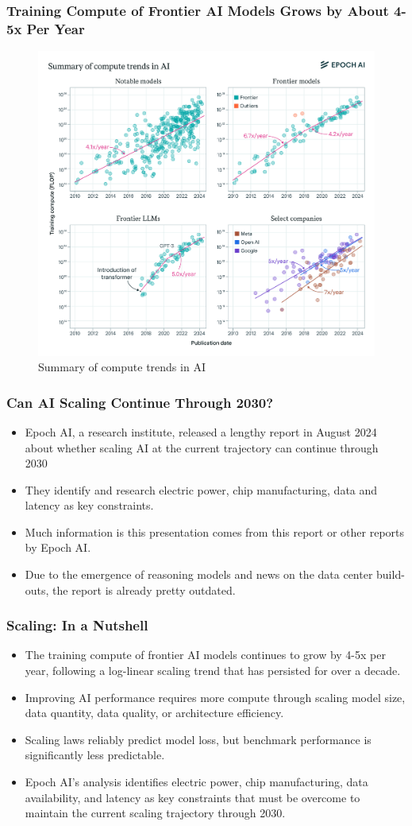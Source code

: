 \documentclass[aspectratio=169]{beamer}
\begin{document}
    \begin{frame}
        \frametitle{Training Compute of Frontier AI Models Grows by About 4-5x Per Year}
        \begin{figure}
            \includegraphics[height=0.45\textwidth]{images/summary_figure}
            \caption{Summary of compute trends in AI~\parencite{epoch2024trainingcomputeoffrontieraimodelsgrowsby45xperyear}}
        \end{figure}
    \end{frame}
    \begin{frame}
        \frametitle{Can AI Scaling Continue Through 2030?}
        \begin{itemize}
            \item Epoch AI, a research institute, released a lengthy report in August 2024 about whether scaling AI at the current trajectory can continue through 2030~\parencite{epoch2024canaiscalingcontinuethrough2030}
            \item They identify and research \alert{electric power}, \alert{chip manufacturing}, \alert{data} and \alert{latency} as key constraints.
            \item Much information is this presentation comes from this report or other reports by Epoch AI\@.
            \item Due to the emergence of reasoning models and news on the data center build-outs, the report is already pretty outdated.
        \end{itemize}
    \end{frame}
    
    \begin{frame}
        \frametitle{Scaling: In a Nutshell}
        \begin{itemize}
            \item The training compute of frontier AI models continues to grow by 4-5x per year, following a log-linear scaling trend that has persisted for over a decade.
            \item Improving AI performance requires more compute through scaling model size, data quantity, data quality, or architecture efficiency.
            \item Scaling laws reliably predict model loss, but benchmark performance is significantly less predictable.
            \item Epoch AI's analysis identifies electric power, chip manufacturing, data availability, and latency as key constraints that must be overcome to maintain the current scaling trajectory through 2030.
        \end{itemize}
    \end{frame}
\end{document}
